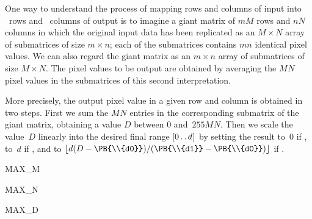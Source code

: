 One way to understand the process of mapping  rows and
columns of input into ~rows and ~columns of output is to
imagine
a giant matrix of $mM$ rows and $nN$ columns in which the original input
data has been replicated as an $M\times N$ array of submatrices of
size $m\times n$; each of the submatrices contains $mn$ identical pixel
values. We can also regard the giant matrix as an $m\times n$ array of
submatrices of size $M\times N$. The pixel values to be output are obtained
by averaging the $M_{}N$ pixel values in the submatrices of this second
interpretation.

More precisely, the output pixel value in a given row and column is obtained
in two steps. First we sum the $M_{}N$ entries in the corresponding submatrix
of the giant matrix, obtaining a value $D$ between 0 and~$255M_{}N$. Then we
scale the value~$D$ linearly into the desired final range
$[0\,.\,.\,d\mskip1mu]$ by
setting the result to~0 if , to~$d$ if , and
to
$\lfloor d(D-\PB{\\{d0}})/(\PB{\\{d1}}-\PB{\\{d0}})\rfloor$ if .

\Y\B\4\D\.{MAX\_M}\5
\par
\B\4\D\.{MAX\_N}\5
\par
\B\4\D\.{MAX\_D}\5
\par
\fi


